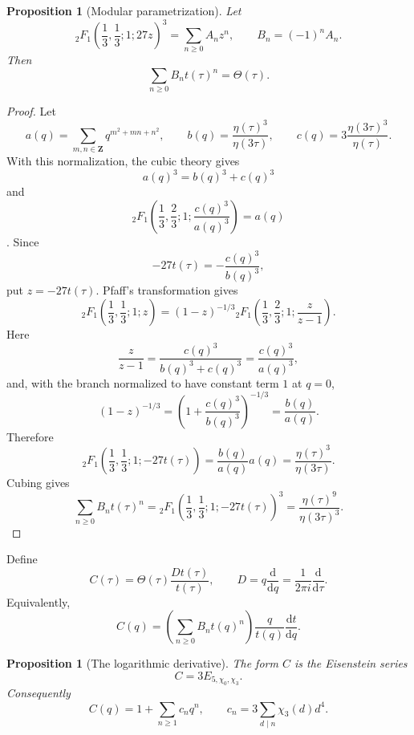 \documentclass[11pt]{amsart}
\newtheorem{proposition}[theorem]{Proposition}
\theoremstyle{remark}
\newcommand{\Z}{\mathbf Z}
\newcommand{\dd}{\mathrm d}
\begin{document}
\begin{proposition}[Modular parametrization]\label{prop:modparam}
Let
\[
 {}_2F_1\!\left(\frac13,\frac13;1;27z\right)^3=\sum_{n\ge0}A_nz^n,
 \qquad
 B_n=(-1)^nA_n.
\]
Then
\[
 \sum_{n\ge0}B_nt(\tau)^n=\Theta(\tau).
\]
\end{proposition}

\begin{proof}
Let
\[
 a(q)=\sum_{m,n\in\Z}q^{m^2+mn+n^2},
 \qquad
 b(q)=\frac{\eta(\tau)^3}{\eta(3\tau)},
 \qquad
 c(q)=3\frac{\eta(3\tau)^3}{\eta(\tau)}.
\]
With this normalization, the cubic theory gives
\[
 a(q)^3=b(q)^3+c(q)^3
\]
and
\[
 {}_2F_1\!\left(\frac13,\frac23;1;\frac{c(q)^3}{a(q)^3}\right)=a(q)
\]
\cite[Theorem 2.3 and Corollary 2.4]{BBG}.
Since
\[
 -27t(\tau)=-\frac{c(q)^3}{b(q)^3},
\]
put $z=-27t(\tau)$.  Pfaff's transformation gives
\[
 {}_2F_1\!\left(\frac13,\frac13;1;z\right)
 =(1-z)^{-1/3}
 {}_2F_1\!\left(\frac13,\frac23;1;\frac{z}{z-1}\right).
\]
Here
\[
 \frac{z}{z-1}
 =\frac{c(q)^3}{b(q)^3+c(q)^3}
 =\frac{c(q)^3}{a(q)^3},
\]
and, with the branch normalized to have constant term $1$ at $q=0$,
\[
 (1-z)^{-1/3}
 =\left(1+\frac{c(q)^3}{b(q)^3}\right)^{-1/3}
 =\frac{b(q)}{a(q)}.
\]
Therefore
\[
 {}_2F_1\!\left(\frac13,\frac13;1;-27t(\tau)\right)
 =\frac{b(q)}{a(q)}a(q)
 =\frac{\eta(\tau)^3}{\eta(3\tau)}.
\]
Cubing gives
\[
 \sum_{n\ge0}B_nt(\tau)^n
 ={}_2F_1\!\left(\frac13,\frac13;1;-27t(\tau)\right)^3
 =\frac{\eta(\tau)^9}{\eta(3\tau)^3}.
\]
\end{proof}

Define
\[
 C(\tau)=\Theta(\tau)\frac{Dt(\tau)}{t(\tau)},
 \qquad
 D=q\frac{\dd}{\dd q}=\frac{1}{2\pi i}\frac{\dd}{\dd\tau}.
\]
Equivalently,
\[
 C(q)=\left(\sum_{n\ge0}B_nt(q)^n\right)\frac{q}{t(q)}\frac{\dd t}{\dd q}.
\]

\begin{proposition}[The logarithmic derivative]\label{prop:C-eis}
The form $C$ is the Eisenstein series
\[
 C=3E_{5,\chi_0,\chi_3}.
\]
Consequently
\[
 C(q)=1+\sum_{n\ge1}c_nq^n,
 \qquad
 c_n=3\sum_{d\mid n}\chi_3(d)d^4.
\]
\end{proposition}
\end{document}
